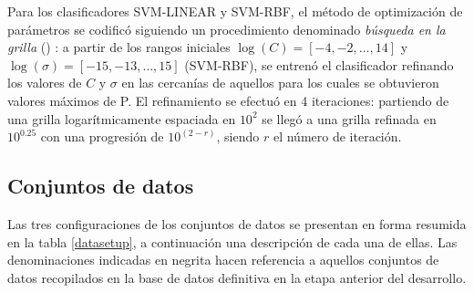 \documentclass[12pt,bibliography=oldstyle,DIV=12,parskip=half-,titlepage]{scrartcl}
\begin{document}
Para los clasificadores SVM-LINEAR y SVM-RBF, el método de
optimización de parámetros se codificó siguiendo un procedimiento
denominado \emph{búsqueda en la grilla} ()
\cite{hsu}: a partir de los rangos iniciales
$\log(C)=[-4,-2,\ldots,14]$ y $\log(\sigma)=[-15,-13,\ldots,15]$
(SVM-RBF), se entrenó el clasificador refinando los valores de $C$ y
$\sigma$ en las cercanías de aquellos para los cuales se obtuvieron
valores máximos de P. El refinamiento se efectuó en 4 iteraciones:
partiendo de una grilla logarítmicamente espaciada en $10^2$ se llegó
a una grilla refinada en $10^{0.25}$ con una progresión de
$10^{(2-r)}$, siendo $r$ el número de iteración.
%
\subsection{Conjuntos de datos}
Las tres configuraciones de los conjuntos de datos se presentan en
forma resumida en la tabla \ref{datasetup}, a continuación una
descripción de cada una de ellas. Las denominaciones indicadas en
negrita hacen referencia a aquellos conjuntos de datos recopilados en
la base de datos definitiva en la etapa anterior del desarrollo.
%
\end{document}
